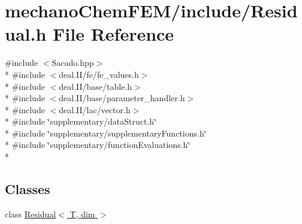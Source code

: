 \section{mechano\-Chem\-F\-E\-M/include/\-Residual.h File Reference}
\label{_residual_8h}
{\ttfamily \#include $<$Sacado.\-hpp$>$}\\*
{\ttfamily \#include $<$deal.\-I\-I/fe/fe\-\_\-values.\-h$>$}\\*
{\ttfamily \#include $<$deal.\-I\-I/base/table.\-h$>$}\\*
{\ttfamily \#include $<$deal.\-I\-I/base/parameter\-\_\-handler.\-h$>$}\\*
{\ttfamily \#include $<$deal.\-I\-I/lac/vector.\-h$>$}\\*
{\ttfamily \#include \char`\"{}supplementary/data\-Struct.\-h\char`\"{}}\\*
{\ttfamily \#include \char`\"{}supplementary/supplementary\-Functions.\-h\char`\"{}}\\*
{\ttfamily \#include \char`\"{}supplementary/function\-Evaluations.\-h\char`\"{}}\\*
\subsection*{Classes}
\begin{DoxyCompactItemize}
\item 
class \hyperlink{class_residual}{Residual$<$ T, dim $>$}
\end{DoxyCompactItemize}
